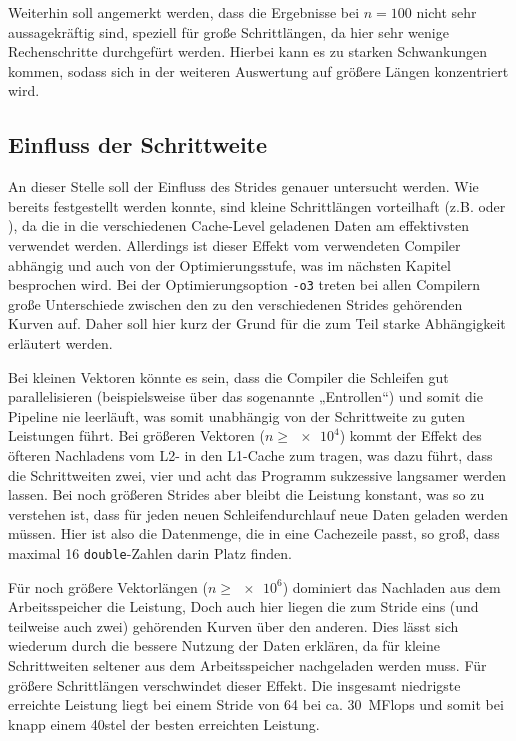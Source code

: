 Weiterhin soll angemerkt werden, dass die Ergebnisse bei $n=100$ nicht sehr
aussagekräftig sind, speziell für große Schrittlängen, da hier sehr wenige Rechenschritte
durchgefürt werden. Hierbei kann es zu starken Schwankungen kommen, sodass sich in
der weiteren Auswertung auf größere Längen konzentriert wird.


\subsection{Einfluss der Schrittweite}
An dieser Stelle soll der Einfluss des Strides genauer untersucht werden. Wie bereits
festgestellt werden konnte, sind kleine Schrittlängen vorteilhaft (z.B. 
oder ), da die in die verschiedenen Cache-Level geladenen Daten am
effektivsten verwendet werden. Allerdings ist dieser Effekt vom verwendeten Compiler
abhängig und auch von der Optimierungsstufe, was im nächsten Kapitel besprochen wird.
Bei der Optimierungsoption \texttt{-o3} treten bei allen Compilern große Unterschiede
zwischen den zu den verschiedenen Strides gehörenden Kurven auf. Daher soll hier kurz 
der Grund für die zum Teil starke Abhängigkeit erläutert werden.

Bei kleinen Vektoren könnte es sein, dass die Compiler die Schleifen gut parallelisieren
(beispielsweise über das sogenannte „Entrollen“) und somit die Pipeline nie
leerläuft, was somit unabhängig von der Schrittweite zu guten Leistungen führt. Bei
größeren Vektoren ($n\ge\num{e4}$) kommt der Effekt des öfteren Nachladens vom L2- in
den L1-Cache zum tragen, was dazu führt, dass die Schrittweiten zwei, vier und acht 
das Programm sukzessive langsamer werden lassen. Bei noch größeren Strides aber bleibt
die Leistung konstant, was so zu verstehen ist, dass für jeden neuen Schleifendurchlauf
neue Daten geladen werden müssen. Hier ist also die Datenmenge, die in eine Cachezeile 
passt, so groß, dass maximal 16 \texttt{double}-Zahlen darin Platz finden.

Für noch größere Vektorlängen ($n\ge \num{e6}$) dominiert das Nachladen aus dem
Arbeitsspeicher die Leistung, Doch auch hier liegen die zum Stride eins (und teilweise
auch zwei) gehörenden Kurven über den anderen. Dies lässt sich wiederum durch die bessere
Nutzung der Daten erklären, da für kleine Schrittweiten seltener aus dem Arbeitsspeicher
nachgeladen werden muss. Für größere Schrittlängen verschwindet dieser Effekt. Die
insgesamt niedrigste erreichte Leistung liegt bei einem Stride von 64 bei ca.
\SI{30}{MFlops} und somit bei knapp einem 40stel der besten erreichten Leistung.





